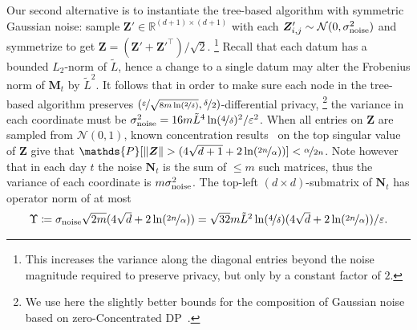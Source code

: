 \documentclass{article}
\makeatletter
\renewcommand{\vec}[1]{\bm{#1}}
\newcommand{\defeq}{\coloneq}
\newcommand{\Real}{\mathds{R}}
\newcommand{\iid}{\text{i.i.d.\@}}
\renewcommand{\Pr}{\mathds{P}}
\providecommand\transp{\top}
\let\transpsymbol\transp
\renewcommand{\transp}[1]{#1^\transpsymbol}
\newcommand{\Normal}{\mathcal{N}}
\makeatother
\begin{document}
Our second alternative is to instantiate the tree-based algorithm with
symmetric Gaussian noise: sample $\vec Z'\in\Real^{(d+1)\times(d+1)}$
with each $\vec Z_{i,j}' \sim \Normal(0,\sigma_{\rm noise}^2)$ \iid{}
and symmetrize to get $\vec Z = (\vec Z'+\transp{\vec Z'})/\sqrt 2$.%
\footnote{This increases the variance along the diagonal entries
  beyond the noise magnitude required to preserve privacy, but only by
  a constant factor of $2$.} %
Recall that each datum has a bounded $L_2$-norm of $\tilde L$, hence a
change to a single datum may alter the Frobenius norm of $\vec M_t$ by
$\tilde L^2$. It follows that in order to make sure each node in the
tree-based algorithm preserves
$(\nicefrac{\varepsilon}{\sqrt{8m\ln(\nicefrac{2}{\delta})}},
\nicefrac{\delta}{2})$-differential privacy,%
\footnote{We use here the slightly better bounds for the composition
  of Gaussian noise based on zero-Concentrated
  DP~\citep{BunConcentratedDifferentialPrivacy2016}.} %
the variance in each coordinate must be
$\sigma_{\rm noise}^2 = 16m\tilde L ^4 \ln(\nicefrac 4 \delta)^2 /
\varepsilon^2$.  When all entries on $\vec Z$ are sampled from
$\Normal(0,1)$, known concentration
results~\cite{TaoRandomMatrixTheory2012} on the top singular value of
$\vec Z$ give that
$\Pr[ \|\vec Z\| > (4\sqrt{d+1} + 2\ln(\nicefrac {2n} \alpha)) ] <
\nicefrac{\alpha}{2n}$. Note however that in each day $t$ the noise
$\vec N_t$ is the sum of $\leq m$ such matrices, thus the variance of
each coordinate is $m\sigma_{\rm noise}^2$.  The top-left
$(d\times d)$-submatrix of $\vec N_t$ has operator norm of at most
\begin{align*}\textstyle
\Upsilon \defeq \sigma_{\rm noise}\sqrt{2m}(4\sqrt{d} +
2\ln(\nicefrac {2n} \alpha)) = \sqrt{32} m\tilde L ^2 \ln(\nicefrac 4
\delta)(4\sqrt{d} + 2\ln(\nicefrac {2n} \alpha)) / \varepsilon.
\end{align*}
\end{document}
